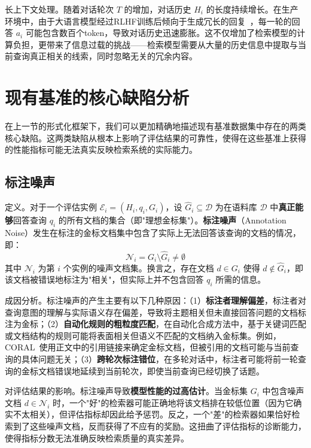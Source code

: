 长上下文处理。随着对话轮次 $T$ 的增加，对话历史 $H_i$ 的长度持续增长。在生产环境中，由于大语言模型经过RLHF训练后倾向于生成冗长的回复~\citep{ouyang2022traininglanguagemodelsfollow}，每一轮的回答 $a_i$ 可能包含数百个token，导致对话历史迅速膨胀。这不仅增加了检索模型的计算负担，更带来了信息过载的挑战——检索模型需要从大量的历史信息中提取与当前查询真正相关的线索，同时忽略无关的冗余内容。


\section{现有基准的核心缺陷分析}
\label{sec:defect_analysis}

在上一节的形式化框架下，我们可以更加精确地描述现有基准数据集中存在的两类核心缺陷。这两类缺陷从根本上影响了评估结果的可靠性，使得在这些基准上获得的性能指标可能无法真实反映检索系统的实际能力。

\subsection{标注噪声}

定义。对于一个评估实例 $\mathcal{E}_i = (H_i, q_i, G_i)$，设 $\hat{G}_i \subseteq \mathcal{D}$ 为在语料库 $\mathcal{D}$ 中\textbf{真正能够}回答查询 $q_i$ 的所有文档的集合（即"理想金标集"）。\textbf{标注噪声}（Annotation Noise）发生在标注的金标文档集中包含了实际上无法回答该查询的文档的情况，即：
\begin{equation}
    \mathcal{N}_i = G_i \setminus \hat{G}_i \neq \emptyset
\end{equation}
其中 $\mathcal{N}_i$ 为第 $i$ 个实例的噪声文档集。换言之，存在文档 $d \in G_i$ 使得 $d \notin \hat{G}_i$，即该文档被错误地标注为"相关"，但实际上并不包含回答 $q_i$ 所需的信息。

成因分析。标注噪声的产生主要有以下几种原因：（1）\textbf{标注者理解偏差}，标注者对查询意图的理解与实际语义存在偏差，导致将主题相关但未直接回答问题的文档标注为金标；（2）\textbf{自动化规则的粗粒度匹配}，在自动化合成方法中，基于关键词匹配或文档结构的规则可能将表面相关但语义不匹配的文档纳入金标集。例如，CORAL~\citep{coral2025}使用正文中的引用链接来确定金标文档，但被引用的文档可能与当前查询的具体问题无关；（3）\textbf{跨轮次标注错位}，在多轮对话中，标注者可能将前一轮查询的金标文档错误地延续到当前轮次，即使当前查询已经切换了话题。

对评估结果的影响。标注噪声导致\textbf{模型性能的过高估计}。当金标集 $G_i$ 中包含噪声文档 $d \in \mathcal{N}_i$ 时，一个"好"的检索器可能正确地将该文档排在较低位置（因为它确实不太相关），但评估指标却因此给予惩罚。反之，一个"差"的检索器如果恰好检索到了这些噪声文档，反而获得了不应有的奖励。这扭曲了评估指标的诊断能力，使得指标分数无法准确反映检索质量的真实差异。

